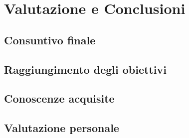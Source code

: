 \chapter{Valutazione e Conclusioni}
\label{cap:conclusioni}

\section{Consuntivo finale}

\section{Raggiungimento degli obiettivi}

\section{Conoscenze acquisite}

\section{Valutazione personale}
